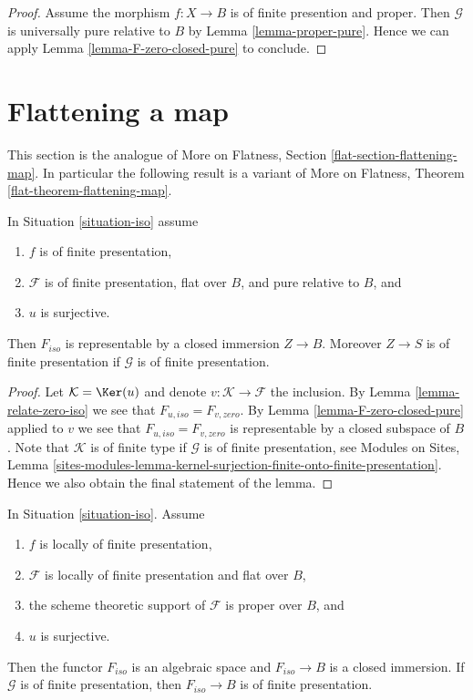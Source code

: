 \begin{proof}
\medskip\noindent
Assume the morphism $f : X \to B$ is of finite presention
and proper. Then $\mathcal{G}$ is universally pure relative
to $B$ by Lemma \ref{lemma-proper-pure}.
Hence we can apply Lemma \ref{lemma-F-zero-closed-pure} to conclude.
\end{proof}








\section{Flattening a map}
\label{section-flattening-map}

\noindent
This section is the analogue of
More on Flatness, Section \ref{flat-section-flattening-map}.
In particular the following result is a variant of
More on Flatness, Theorem \ref{flat-theorem-flattening-map}.

\begin{theorem}
\label{theorem-flattening-map}
In Situation \ref{situation-iso} assume
\begin{enumerate}
\item $f$ is of finite presentation,
\item $\mathcal{F}$ is of finite presentation, flat over $B$, and
pure relative to $B$, and
\item $u$ is surjective.
\end{enumerate}
Then $F_{iso}$ is representable by a closed immersion $Z \to B$.
Moreover $Z \to S$ is of finite presentation if $\mathcal{G}$ is
of finite presentation.
\end{theorem}

\begin{proof}
Let $\mathcal{K} = \Ker(u)$ and denote $v : \mathcal{K} \to \mathcal{F}$
the inclusion. By Lemma \ref{lemma-relate-zero-iso} we see that
$F_{u, iso} = F_{v, zero}$. By Lemma \ref{lemma-F-zero-closed-pure}
applied to $v$ we see that $F_{u, iso} = F_{v, zero}$ is representable
by a closed subspace of $B$. Note that $\mathcal{K}$ is of finite type
if $\mathcal{G}$ is of finite presentation, see
Modules on Sites, Lemma
\ref{sites-modules-lemma-kernel-surjection-finite-onto-finite-presentation}.
Hence we also obtain the final statement of the lemma.
\end{proof}

\begin{lemma}
\label{lemma-F-iso-closed}
In Situation \ref{situation-iso}. Assume
\begin{enumerate}
\item $f$ is locally of finite presentation,
\item $\mathcal{F}$ is locally of finite presentation and flat over $B$,
\item the scheme theoretic support of $\mathcal{F}$ is proper over $B$, and
\item $u$ is surjective.
\end{enumerate}
Then the functor $F_{iso}$ is an algebraic space and $F_{iso} \to B$
is a closed immersion. If $\mathcal{G}$ is of finite presentation, then
$F_{iso} \to B$ is of finite presentation.
\end{lemma}


